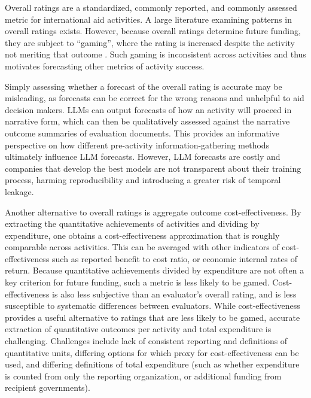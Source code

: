 \documentclass[12pt,a4paper]{article}
\let\citep\parencite
\begin{document}
Overall ratings are a standardized, commonly reported, and commonly assessed metric for international aid activities. A large literature examining patterns in overall ratings exists. However, because overall ratings determine future funding, they are subject to ``gaming'', where the rating is increased despite the activity not meriting that outcome \citep{goldembergMindingGapAid2025}. Such gaming is inconsistent across activities and thus motivates forecasting other metrics of activity success.

Simply assessing whether a forecast of the overall rating is accurate may be misleading, as forecasts can be correct for the wrong reasons and unhelpful to aid decision makers. LLMs can output forecasts of how an activity will proceed in narrative form, which can then be qualitatively assessed against the narrative outcome summaries of evaluation documents. This provides an informative perspective on how different pre-activity information-gathering methods ultimately influence LLM forecasts. However, LLM forecasts are costly and companies that develop the best models are not transparent about their training process, harming reproducibility and introducing a greater risk of temporal leakage.

Another alternative to overall ratings is aggregate outcome cost-effectiveness. By extracting the quantitative achievements of activities and dividing by expenditure, one obtains a cost-effectiveness approximation that is roughly comparable across activities. This can be averaged with other indicators of cost-effectiveness such as reported benefit to cost ratio, or economic internal rates of return. Because quantitative achievements divided by expenditure are not often a key criterion for future funding, such a metric is less likely to be gamed. Cost-effectiveness is also less subjective than an evaluator's overall rating, and is less susceptible to systematic differences between evaluators. While cost-effectiveness provides a useful alternative to ratings that are less likely to be gamed, accurate extraction of quantitative outcomes per activity and total expenditure is challenging. Challenges include lack of consistent reporting and definitions of quantitative units, differing options for which proxy for cost-effectiveness can be used, and differing definitions of total expenditure (such as whether expenditure is counted from only the reporting organization, or additional funding from recipient governments).
\end{document}
